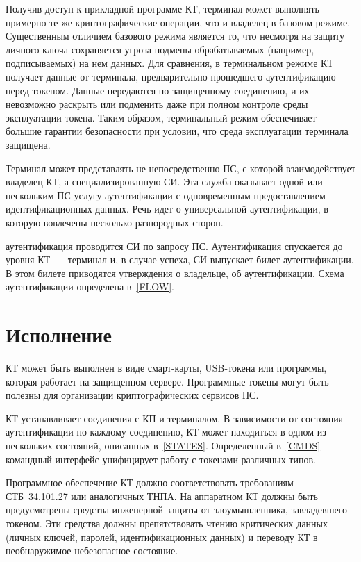 Получив доступ к прикладной программе КТ, терминал может выполнять примерно те 
же криптографические операции, что и владелец в базовом режиме. Существенным
отличием базового режима является то, что несмотря на защиту личного ключа
сохраняется угроза подмены обрабатываемых (например, подписываемых) 
на нем данных. Для сравнения, в терминальном режиме КТ получает данные от
терминала, предварительно прошедшего аутентификацию перед токеном. Данные
передаются по защищенному соединению, и их невозможно раскрыть или подменить
даже при полном контроле среды эксплуатации токена. Таким образом, терминальный
режим обеспечивает большие гарантии безопасности при условии, что среда
эксплуатации терминала защищена.

Терминал может представлять не непосредственно ПС, с которой взаимодействует 
владелец КТ, а специализированную СИ. Эта служба оказывает одной или 
нескольким ПС услугу аутентификации с одновременным предоставлением 
идентификационных данных. Речь идет о  универсальной аутентификации, 
в которую вовлечены несколько разнородных сторон.  

 аутентификация проводится СИ по запросу ПС. Аутентификация спускается 
до уровня КТ~--- терминал и, в случае успеха,  СИ выпускает билет 
аутентификации. В этом билете приводятся утверждения о владельце, об 
аутентификации. Схема  аутентификации определена в~\ref{FLOW}.

\section{Исполнение} 

КТ может быть выполнен в виде смарт-карты, USB-токена 
или программы, которая работает на защищенном сервере. 
Программные токены могут быть полезны для организации криптографических 
сервисов ПС. 

КТ устанавливает соединения с КП и терминалом.
В зависимости от состояния аутентификации по каждому соединению,
КТ может находиться в одном из нескольких состояний,
описанных в~\ref{STATES}.
%
Определенный в~\ref{CMDS} командный интерфейс 
унифицирует работу с токенами различных типов.

Программное обеспечение КТ должно соответствовать требованиям СТБ~34.101.27  или
аналогичных ТНПА. На аппаратном КТ должны быть предусмотрены средства инженерной
защиты от злоумышленника, завладевшего токеном. Эти средства должны
препятствовать чтению критических данных (личных ключей, паролей,
идентификационных данных) и переводу КТ в необнаружимое небезопасное состояние.

